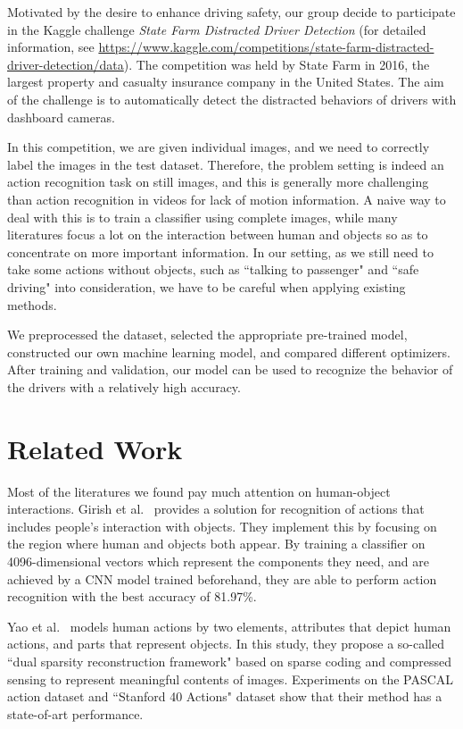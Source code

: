 \documentclass[final]{cvpr}
\begin{document}
Motivated by the desire to enhance driving safety, our group decide to participate in the Kaggle challenge \textit{State Farm Distracted Driver Detection} (for detailed information, see \url{https://www.kaggle.com/competitions/state-farm-distracted-driver-detection/data}). The competition was held by State Farm in 2016, the largest property and casualty insurance company in the United States. The aim of the challenge is to automatically detect the distracted behaviors of drivers with dashboard cameras.

In this competition, we are given individual images, and we need to correctly label the images in the test dataset. Therefore, the problem setting is indeed an action recognition task on still images, and this is generally more challenging than action recognition in videos for lack of motion information. A naive way to deal with this is to train a classifier using complete images, while many literatures focus a lot on the interaction between human and objects so as to concentrate on more important information. In our setting, as we still need to take some actions without objects, such as ``talking to passenger" and ``safe driving" into consideration, we have to be careful when applying existing methods.

We preprocessed the dataset, selected the appropriate pre-trained model, constructed our own machine learning model, and compared different optimizers. After training and validation, our model can be used to recognize the behavior of the drivers with a relatively high accuracy.
\section{Related Work}
    Most of the literatures we found pay much attention on human-object interactions. Girish et al.~\cite{action_reco_still} provides a solution for recognition of actions that includes people's interaction with objects. They implement this by focusing on the region where human and objects both appear. By training a classifier on 4096-dimensional vectors which represent the components they need, and are achieved by a CNN model trained beforehand, they are able to perform action recognition with the best accuracy of 81.97\%.
    
    Yao et al.~\cite{attri_parts} models human actions by two elements, attributes that depict human actions, and parts that represent objects. In this study, they propose a so-called ``dual sparsity reconstruction framework" based on sparse coding and compressed sensing to represent meaningful contents of images. Experiments on the PASCAL action dataset and ``Stanford 40 Actions" dataset show that their method has a state-of-art performance.
    
\end{document}
